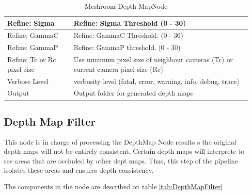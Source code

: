 \documentclass[12pt]{report}
\begin{document}
\begin{table}[h!]
{\begin{tabular}{|l|l|}
  Refine: Sigma                       & Refine: Sigma Threshold (0 - 30)                                        \\ \hline
  Refine: GammaC                      & Refine: GammaC Threshold. (0 - 30)                                      \\ \hline
  Refine: GammaP                      & Refine: GammaP threshold. (0 - 30)                                      \\ \hline
  Refine: Tc or Rc pixel size    & Use minimum pixel size of neighbour cameras (Tc) or current camera pixel size (Rc)                                \\ \hline
  Verbose Level                       & verbosity level (fatal, error, warning, info, debug, trace)             \\ \hline
  Output                              & Output folder for generated depth maps                                  \\ \hline
  \end{tabular}%
  }
  \caption{Meshroom Depth MapNode}
  \label{tab:DepthMap}
  \end{table}

\newpage
\subsection{Depth Map Filter}
This node is in charge of processing the DepthMap Node results s the original depth maps will not be entirely consistent.
Certain depth maps will interprete to see areas that are occluded by other dept maps. Thus, this step of the pipeline isolates these areas and ensures depth consistency.

The components in the node are described on table \ref{tab:DepthMapFilter}
\end{document}

